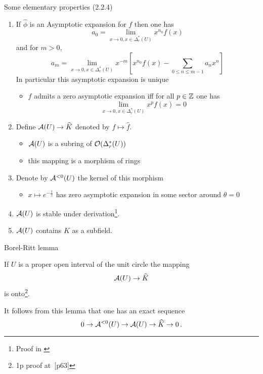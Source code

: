 \begin{frame}{Some elementary properties (2.2.4)}
  \begin{enumerate}
    \item If $\hat\phi$ is an Asymptotic expansion for $f$ then one has
      \[
        a_0=\lim_{x\to 0,x\in\Delta_r^*(U)}x^{n_0}f(x)
      \]
      and for $m>0$,
      \[
        a_m=\lim_{x\to 0,x\in\Delta_r^*(U)}x^{-m}
          \left[x^{n_0}f(x)-\sum_{0\leq n\leq m-1}a_nx^n\right]
      \]
      In particular this asymptotic expansion is unique
      \begin{itemize}
        \item $f$ admits a zero asymptotic expansion iff for all $p\in\mathbb{Z}$
          one has
          \[
            \lim_{x\to 0,x\in\Delta_r^*(U)}x^pf(x)=0
          \]
      \end{itemize}
    \item
      Define $\mathcal{A}(U)\to \widehat K$ denoted by $f\mapsto \hat{f}$.
      \begin{itemize}
        \item $\mathcal{A}(U)$ is a subring of $\mathcal{O}(\Delta_r^*(U))$
        \item this mapping is a morphism of rings
      \end{itemize}
    \item Denote by $\mathcal{A}^{<0}(U)$ the kernel of this morphism
      \begin{itemize}
        \item $x\mapsto e^{-\frac{1}{x}}$ has zero asymptotic expansion in
          some sector around $\theta=0$
      \end{itemize}
    \item $\mathcal{A}(U)$ is stable under derivation\footnote{Proof in
      \cite{sabbah_cimpa90}}.
    \item $\mathcal{A}(U)$ contains $K$ as a subfield.
  \end{enumerate}
\end{frame}

\begin{frame}{Borel-Ritt lemma}
  \begin{lem}[2.2.5]
  If $U$ is a proper open interval of the unit circle the mapping
  \[
  \mathcal{A}(U)\to\widehat{K}
  \]
  is onto\footnote{1p proof at~\cite{sabbah_cimpa90}[p63]}.
  \end{lem}

  It follows from this lemma that one has an exact sequence
  \[
    0 \to \mathcal{A}^{<0}(U) \to \mathcal{A}(U) \to \widehat{K} \to 0 \,.
  \]
\end{frame}

